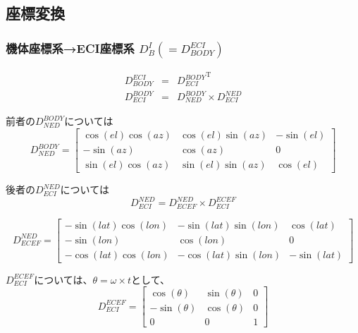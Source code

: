 \documentclass[12pt]{jsarticle}
\begin{document}
\subsection{座標変換}

\subsubsection{機体座標系→ECI座標系 $D_{B}^{I} (= D_{BODY}^{ECI})$}

\begin{eqnarray}
  D_{BODY}^{ECI} &=& {D_{ECI}^{BODY}}^{\mathrm{T}} \\
  D_{ECI}^{BODY} &=& D_{NED}^{BODY} \times D_{ECI}^{NED}
\end{eqnarray}

前者の$D_{NED}^{BODY}$については
\begin{equation}
  D_{NED}^{BODY} = \left[
  \begin{array}{ccc}
    \cos(el)\cos(az) & \cos(el)\sin(az) & -\sin(el) \\[2mm]
    -\sin(az) & \cos(az) & 0 \\[2mm]
    \sin(el)\cos(az) & \sin(el)\sin(az) & \cos(el)
  \end{array} \right]
\end{equation}

後者の$D_{ECI}^{NED}$については
\begin{equation}
  D_{ECI}^{NED} = D_{ECEF}^{NED} \times D_{ECI}^{ECEF}
  \label{eq:ECI2NED}
\end{equation}

\begin{equation}
  D_{ECEF}^{NED} = \left[
  \begin{array}{ccc}
    -\sin(lat)\cos(lon) & -\sin(lat)\sin(lon) & \cos(lat) \\[2mm]
    -\sin(lon) & \cos(lon) & 0 \\[2mm]
    -\cos(lat)\cos(lon) & -\cos(lat)\sin(lon) & -\sin(lat)
  \end{array} \right]
\end{equation}

$D_{ECI}^{ECEF}$については、$\theta=\omega\times t$として、
\begin{equation}
  D_{ECI}^{ECEF} = \left[
  \begin{array}{ccc}
    \cos(\theta) & \sin(\theta) & 0 \\[1mm]
    -\sin(\theta) & \cos(\theta) & 0 \\[1mm]
    0 & 0 & 1
  \end{array} \right]
\end{equation}
\end{document}

